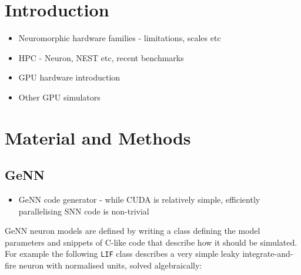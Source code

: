 \documentclass[utf8]{frontiersSCNS} %
\begin{document}
\section{Introduction}

\begin{itemize}
    \item Neuromorphic hardware families - limitations, scales etc
    \item HPC - Neuron, NEST etc, recent benchmarks
    \item GPU hardware introduction
    \item Other GPU simulators
\end{itemize}

\section{Material and Methods}
\label{sec:method}
\subsection{GeNN}
\begin{itemize}
    \item GeNN code generator - while CUDA is relatively simple, efficiently parallelising SNN code is non-trivial    
\end{itemize}

GeNN neuron models are defined by writing a class defining the model parameters and snippets of C-like code that describe how it should be simulated.
For example the following \lstinline{LIF} class describes a very simple leaky integrate-and-fire neuron with normalised units, solved algebraically:


\end{document}
